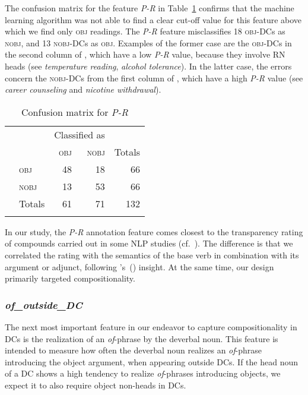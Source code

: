 \documentclass[output=paper]{langsci/langscibook}
\begin{document}
The confusion matrix for the feature \textit{P-R} in Table~\ref{tab:conf:p-r} confirms that the machine learning algorithm was not able to find a clear cut-off value for this feature above which we find only \textsc{obj} readings. The \textit{P-R} feature misclassifies 18 \textsc{obj}-DCs as \textsc{nobj}, and 13 \textsc{nobj}-DCs as \textsc{obj}. Examples of the former case are the \textsc{obj}-DCs in the second column of , which have a low \textit{P-R} value, because they involve RN heads (see \textit{temperature reading}, \textit{alcohol tolerance}). In the latter case, the errors concern the \textsc{nobj}-DCs from the first column of , which have a high \textit{P-R} value (see \textit{career counseling} and \textit{nicotine withdrawal}).

\begin{table}
\caption{\label{tab:conf:p-r}Confusion matrix for \textit{P-R}}
\begin{tabular}{llrrr}
\lsptoprule
& & \multicolumn{2}{c}{Classified as}\\
\cmidrule(lr){3-4}
&&  \textsc{obj}&\textsc{nobj}&Totals \\    
\parbox[t]{2mm}{} & \textsc{obj} &48 &18&66 \\
& \textsc{nobj}&13 & 53&66  \\
&Totals&61 &71&132\\
\lspbottomrule
\end{tabular}
\end{table}



In our study, the \textit{P-R} annotation feature comes closest to the  {transparency} rating of compounds carried out in some NLP studies (cf.~). The difference is that we correlated the rating with the semantics of the base verb in combination with its argument or adjunct, following \citeauthor{grimshaw:90}'s~(\citeyear{grimshaw:90}) insight.  {At the same time, our design primarily targeted compositionality.} 


\subsubsection{\textit{of\_outside\_DC}}\label{sec:gia:discussion-int-of}

The next most important feature in our endeavor to capture compositionality in DCs is the realization of an \textit{of}-phrase by the deverbal noun. This feature is intended to measure how often the deverbal noun realizes an \textit{of}-phrase introducing the object argument, when appearing outside DCs. If the head noun of a DC shows a high tendency to realize \textit{of}-phrases introducing objects, we expect it to also require object non-heads in DCs.
\end{document}

